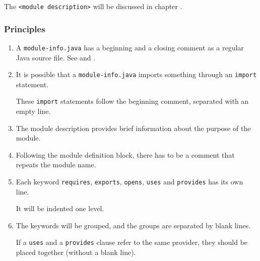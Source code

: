 The \texttt{<module description>} will be discussed in chapter .

\subsubsection{Principles}
\begin{enumerate}[label=P\arabic*.]
	\item{A \mbox{\texttt{module-info.java}} has a beginning and a closing comment as a regular Java source file. See  and .}
	\item{It is possible that a \mbox{\texttt{module-info.java}} imports something through an \lstinline|import| statement.

These \lstinline|import| statements follow the beginning comment, separated with an empty line.}
	\item{The module description provides brief information about the purpose of the module.}
	\item{Following the module definition block, there has to be a comment that repeats the module name.}
	\item{Each keyword \lstinline|requires|, \lstinline|exports|, \lstinline|opens|, \lstinline|uses| and \lstinline|provides| has its own line.
	
	It will be indented one level.}
	\item{The keywords will be grouped, and the groups are separated by blank lines.
	
	If a \lstinline|uses| and a \lstinline|provides| clause refer to the same provider, they should be placed together (without a blank line).}
\end{enumerate}

